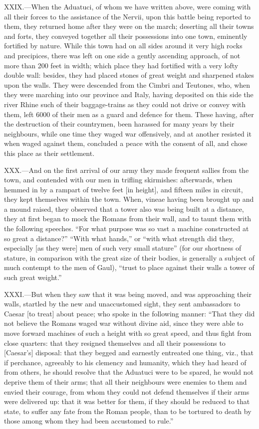XXIX.—When the Aduatuci, of whom we have written above, were coming
with all their forces to the assistance of the Nervii, upon this battle
being reported to them, they returned home after they were on the march;
deserting all their towns and forts, they conveyed together all their
possessions into one town, eminently fortified by nature. While this
town had on all sides around it very high rocks and precipices, there
was left on one side a gently ascending approach, of not more than 200
feet in width; which place they had fortified with a very lofty double
wall: besides, they had placed stones of great weight and sharpened
stakes upon the walls. They were descended from the Cimbri and Teutones,
who, when they were marching into our province and Italy, having
deposited on this side the river Rhine such of their baggage-trains as
they could not drive or convey with them, left 6000 of their men as a
guard and defence for them. These having, after the destruction of their
countrymen, been harassed for many years by their neighbours, while one
time they waged war offensively, and at another resisted it when waged
against them, concluded a peace with the consent of all, and chose this
place as their settlement.

XXX.—And on the first arrival of our army they made frequent sallies
from the town, and contended with our men in trifling skirmishes:
afterwards, when hemmed in by a rampart of twelve feet [in height], and
fifteen miles in circuit, they kept themselves within the town. When,
vineae having been brought up and a mound raised, they observed that a
tower also was being built at a distance, they at first began to mock
the Romans from their wall, and to taunt them with the following
speeches. ``For what purpose was so vast a machine constructed at so
great a distance?'' ``With what hands,'' or ``with what strength did they,
especially [as they were] men of such very small stature'' (for our
shortness of stature, in comparison with the great size of their bodies,
is generally a subject of much contempt to the men of Gaul), ``trust to
place against their walls a tower of such great weight.''

XXXI.—But when they saw that it was being moved, and was approaching
their walls, startled by the new and unaccustomed sight, they sent
ambassadors to Caesar [to treat] about peace; who spoke in the following
manner: ``That they did not believe the Romans waged war without divine
aid, since they were able to move forward machines of such a height with
so great speed, and thus fight from close quarters: that they resigned
themselves and all their possessions to [Caesar's] disposal: that they
begged and earnestly entreated one thing, viz., that if perchance,
agreeably to his clemency and humanity, which they had heard of from
others, he should resolve that the Aduatuci were to be spared, he would
not deprive them of their arms; that all their neighbours were enemies
to them and envied their courage, from whom they could not defend
themselves if their arms were delivered up: that it was better for them,
if they should be reduced to that state, to suffer any fate from the
Roman people, than to be tortured to death by those among whom they had
been accustomed to rule.''

